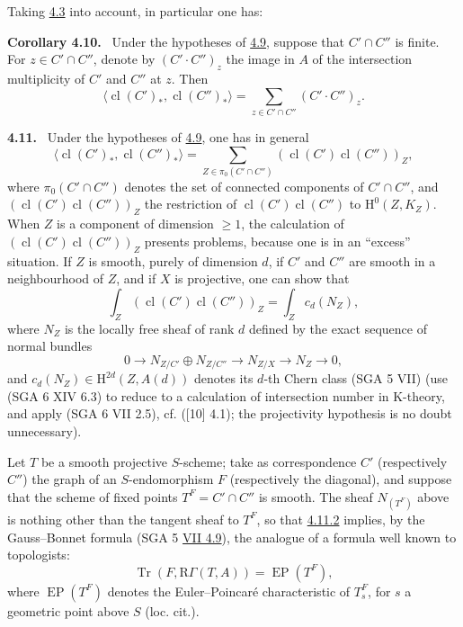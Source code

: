 \documentclass[11pt]{article}
\newenvironment{statement}[1]{\par\medskip\noindent\textbf{#1.}\ }{\par\medskip}
\renewcommand{\H}{\mathrm{H}}
\newcommand{\R}{\mathrm{R}}
\providecommand{\cl}{\operatorname{cl}}
\providecommand{\Tr}{\operatorname{Tr}}
\providecommand{\EP}{\operatorname{EP}}
\providecommand{\Tr}{\operatorname{Tr}}
\providecommand{\Tr}{\operatorname{Tr}}
\providecommand{\R}{\mathrm R}
\providecommand{\Tr}{\operatorname{Tr}}
\providecommand{\cl}{\operatorname{cl}}
\providecommand{\EP}{\operatorname{EP}}
\providecommand{\cl}{\operatorname{cl}}
\providecommand{\Tr}{\operatorname{Tr}}
\begin{document}
Taking \hyperref[sga5:III:example:4.3]{4.3} into account, in particular one has:

\label{sga5:III:corollary:4.10}\begin{statement}{Corollary 4.10}
Under the hypotheses of \hyperref[sga5:III:corollary:4.9]{4.9}, suppose that $C'\cap C''$ is finite. For $z\in C'\cap C''$, denote by $(C'\!\cdot C'')_z$ the image in $A$ of the intersection multiplicity of $C'$ and $C''$ at $z$. Then
\[
\langle \cl(C')_*,\cl(C'')_*\rangle
=
\sum_{z\in C'\cap C''}(C'\!\cdot C'')_z.
\]
\end{statement}

\label{sga5:III:statement:4.11}\begin{statement}{4.11}
Under the hypotheses of \hyperref[sga5:III:corollary:4.9]{4.9}, one has in general
\begin{equation}
\tag{4.11.1}\label{sga5:III:equation:4.11.1}
\langle \cl(C')_*,\cl(C'')_*\rangle
=
\sum_{Z\in\pi_0(C'\cap C'')}(\cl(C')\cl(C''))_Z,
\end{equation}
where $\pi_0(C'\cap C'')$ denotes the set of connected components of $C'\cap C''$, and $(\cl(C')\cl(C''))_Z$ the restriction of $\cl(C')\cl(C'')$ to $\H^0(Z,K_Z)$. When $Z$ is a component of dimension $\geq 1$, the calculation of $(\cl(C')\cl(C''))_Z$ presents problems, because one is in an ``excess'' situation. If $Z$ is smooth, purely of dimension $d$, if $C'$ and $C''$ are smooth in a neighbourhood of $Z$, and if $X$ is projective, one can show that
\begin{equation}
\tag{4.11.2}\label{sga5:III:equation:4.11.2}
\int_Z(\cl(C')\cl(C''))_Z=\int_Z c_d(N_Z),
\end{equation}
where $N_Z$ is the locally free sheaf of rank $d$ defined by the exact sequence of normal bundles
\[
0\longrightarrow N_{Z/C'}\oplus N_{Z/C''}\longrightarrow N_{Z/X}\longrightarrow N_Z\longrightarrow 0,
\]
and $c_d(N_Z)\in \H^{2d}(Z,A(d))$ denotes its $d$-th Chern class (SGA 5 VII) (use (SGA 6 XIV 6.3) to reduce to a calculation of intersection number in K-theory, and apply (SGA 6 VII 2.5), cf. ([10] 4.1); the projectivity hypothesis is no doubt unnecessary).

Let $T$ be a smooth projective $S$-scheme; take as correspondence $C'$ (respectively $C''$) the graph of an $S$-endomorphism $F$ (respectively the diagonal), and suppose that the scheme of fixed points $T^F=C'\cap C''$ is smooth. The sheaf $N_{(T^F)}$ above is nothing other than the tangent sheaf to $T^F$, so that \hyperref[sga5:III:equation:4.11.2]{4.11.2} implies, by the Gauss--Bonnet formula (SGA 5 \hyperref[sga5:VII:corollary:4.9]{VII 4.9}), the analogue of a formula well known to topologists:
\begin{equation}
\tag{4.11.3}\label{sga5:III:equation:4.11.3}
\Tr(F,\R\Gamma(T,A))=\EP(T^F),
\end{equation}
where $\EP(T^F)$ denotes the Euler--Poincaré characteristic of $T_s^F$, for $s$ a geometric point above $S$ (loc. cit.).
\end{statement}
\end{document}
